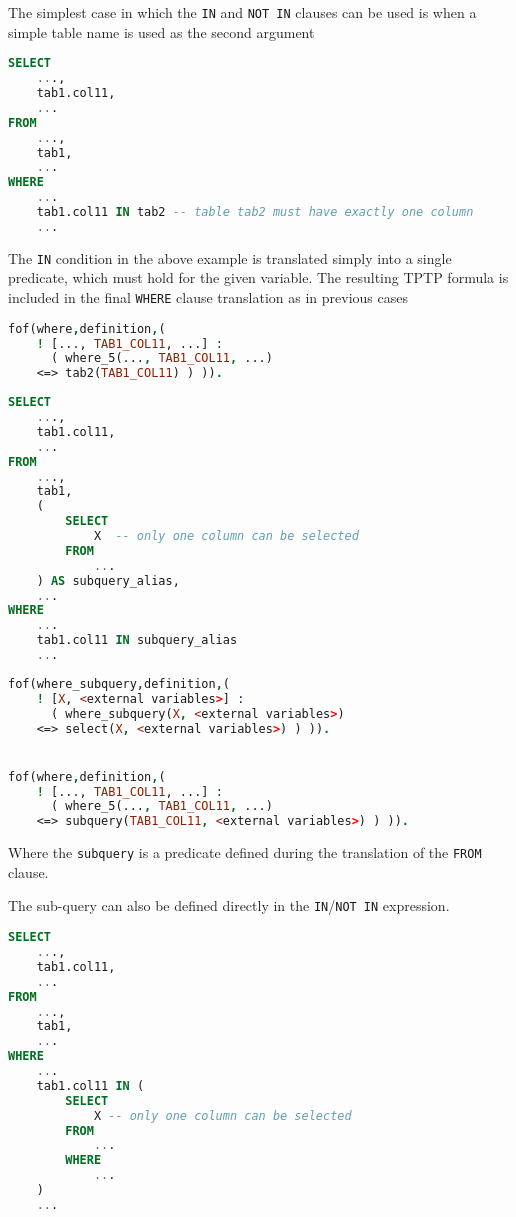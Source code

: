 \documentclass[magisterska,en]{pracamgr}
\newcommand{\code}[1]{\texttt{#1}}
\begin{document}
The simplest case in which the \code{IN} and \code{NOT IN} clauses can be used is when a simple table name is used as the second argument

\begin{lstlisting}[language=SQL]
SELECT
    ...,
    tab1.col11,
    ...
FROM
    ...,
    tab1,
    ...
WHERE
    ...
    tab1.col11 IN tab2 -- table tab2 must have exactly one column
    ...
\end{lstlisting}

The \code{IN} condition in the above example is translated simply into a single predicate, which must hold for the given variable. The resulting TPTP formula is included in the final \code{WHERE} clause translation as in previous cases

\begin{lstlisting}[language=Prolog]
fof(where,definition,(
    ! [..., TAB1_COL11, ...] :
      ( where_5(..., TAB1_COL11, ...)
    <=> tab2(TAB1_COL11) ) )). 
\end{lstlisting}


\begin{lstlisting}[language=SQL]
SELECT
    ...,
    tab1.col11,
    ...
FROM
    ...,
    tab1,
    (
        SELECT
            X  -- only one column can be selected
        FROM
            ...
    ) AS subquery_alias,
    ...
WHERE
    ...
    tab1.col11 IN subquery_alias
    ...
\end{lstlisting}

\begin{lstlisting}[language=Prolog]
fof(where_subquery,definition,(
    ! [X, <external variables>] :
      ( where_subquery(X, <external variables>)
    <=> select(X, <external variables>) ) )). 


fof(where,definition,(
    ! [..., TAB1_COL11, ...] :
      ( where_5(..., TAB1_COL11, ...)
    <=> subquery(TAB1_COL11, <external variables>) ) )). 
\end{lstlisting}

Where the \code{subquery} is a predicate defined during the translation of the \code{FROM} clause.

The sub-query can also be defined directly in the \code{IN}/\code{NOT IN} expression.

\begin{lstlisting}[language=SQL]
SELECT
    ...,
    tab1.col11,
    ...
FROM
    ...,
    tab1,
    ...
WHERE
    ...
    tab1.col11 IN (
        SELECT
            X -- only one column can be selected
        FROM
            ...
        WHERE
            ...
    )
    ...
\end{lstlisting}
\end{document}
